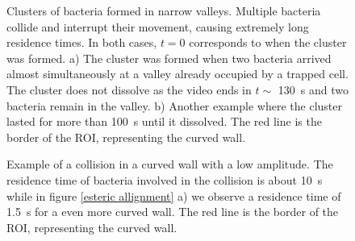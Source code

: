 \begin{figure}[H]
	\centering
	
	\caption[Clusters formed in valleys of the most ]{Clusters of bacteria formed in narrow valleys. Multiple bacteria collide and interrupt their movement, causing extremely long residence times. In both cases, $t=0$ corresponds to when the cluster was formed. a) The cluster was formed when two bacteria arrived almost simultaneously at a valley already occupied by a trapped cell. The cluster does not dissolve as the video ends in $t\sim$ \SI{130}{\second} and two bacteria remain in the valley. b) Another example where the cluster lasted for more than \SI{100}{\second} until it dissolved. The red line is the border of the ROI, representing the curved wall.}
	\label{clustering}
\end{figure}

\begin{figure}[H]
	\centering
	
	\caption[Collision in a curved wall with low amplitude]{Example of a collision in a curved wall with a low amplitude. The residence time of bacteria involved in the collision is about \SI{10}{\second} while in figure \ref{esteric allignment} a) we observe a residence time of \SI{1.5}{\second} for a even more curved wall. The red line is the border of the ROI, representing the curved wall. }
	\label{cluster with low amplitude}
\end{figure}


